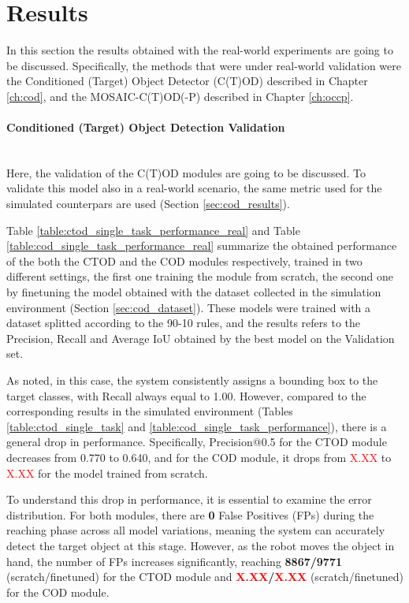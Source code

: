 \section{Results}
\label{sec:real_results}
In this section the results obtained with the real-world experiments are going to be discussed.
Specifically, the methods that were under real-world validation were the Conditioned (Target) Object Detector (C(T)OD) described in Chapter \ref{ch:cod}, and the MOSAIC-C(T)OD(-P) described in Chapter \ref{ch:occp}.

\paragraph*{Conditioned (Target) Object Detection Validation}\mbox{}\\
Here, the validation of the C(T)OD modules are going to be discussed. To validate this model also in a real-world scenario, the same metric used for the simulated counterpars are used (Section \ref{sec:cod_results}). 

Table \ref{table:ctod_single_task_performance_real} and Table \ref{table:cod_single_task_performance_real} summarize the obtained performance of the both the CTOD and the COD modules respectively, trained in two different settings, the first one training the module from scratch, the second one by finetuning the model obtained with the dataset collected in the simulation environment (Section \ref{sec:cod_dataset}). These models were trained with a dataset splitted according to the 90-10 rules, and the results refers to the Precision, Recall and Average IoU obtained by the best model on the Validation set.




As noted, in this case, the system consistently assigns a bounding box to the target classes, with Recall always equal to 1.00. However, compared to the corresponding results in the simulated environment (Tables \ref{table:ctod_single_task} and \ref{table:cod_single_task_performance}), there is a general drop in performance. Specifically, Precision@0.5 for the CTOD module decreases from 0.770 to 0.640, and for the COD module, it drops from \textcolor{red}{X.XX} to \textcolor{red}{X.XX} for the model trained from scratch.

To understand this drop in performance, it is essential to examine the error distribution. For both modules, there are \textbf{0} False Positives (FPs) during the reaching phase across all model variations, meaning the system can accurately detect the target object at this stage. However, as the robot moves the object in hand, the number of FPs increases significantly, reaching \textbf{8867/9771} (scratch/finetuned) for the CTOD module and \textbf{\textcolor{red}{X.XX}/\textcolor{red}{X.XX}} (scratch/finetuned) for the COD module.

